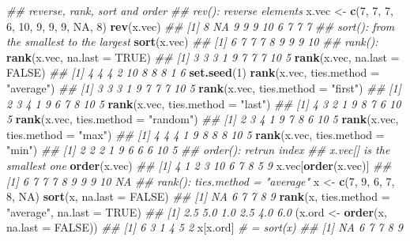 \documentclass[
]{book}
\newenvironment{Shaded}{\begin{snugshade}}{\end{snugshade}}
\newcommand{\CommentTok}[1]{\textcolor[rgb]{0.56,0.35,0.01}{\textit{#1}}}
\newcommand{\DataTypeTok}[1]{\textcolor[rgb]{0.13,0.29,0.53}{#1}}
\newcommand{\DecValTok}[1]{\textcolor[rgb]{0.00,0.00,0.81}{#1}}
\newcommand{\KeywordTok}[1]{\textcolor[rgb]{0.13,0.29,0.53}{\textbf{#1}}}
\newcommand{\NormalTok}[1]{#1}
\newcommand{\OtherTok}[1]{\textcolor[rgb]{0.56,0.35,0.01}{#1}}
\newcommand{\StringTok}[1]{\textcolor[rgb]{0.31,0.60,0.02}{#1}}
\begin{document}
\begin{Shaded}
\begin{Highlighting}[]
\CommentTok{\#\# reverse, rank, sort and order}
\CommentTok{\#\# rev(): reverse elements}
\NormalTok{x.vec \textless{}{-}}\StringTok{ }\KeywordTok{c}\NormalTok{(}\DecValTok{7}\NormalTok{, }\DecValTok{7}\NormalTok{, }\DecValTok{7}\NormalTok{, }\DecValTok{6}\NormalTok{, }\DecValTok{10}\NormalTok{, }\DecValTok{9}\NormalTok{, }\DecValTok{9}\NormalTok{, }\DecValTok{9}\NormalTok{, }\OtherTok{NA}\NormalTok{, }\DecValTok{8}\NormalTok{)}
\KeywordTok{rev}\NormalTok{(x.vec)}
\CommentTok{\#\#  [1]  8 NA  9  9  9 10  6  7  7  7}
\CommentTok{\#\# sort(): from the smallest to the largest}
\KeywordTok{sort}\NormalTok{(x.vec)}
\CommentTok{\#\# [1]  6  7  7  7  8  9  9  9 10}
\CommentTok{\#\# rank():}
\KeywordTok{rank}\NormalTok{(x.vec, }\DataTypeTok{na.last =} \OtherTok{TRUE}\NormalTok{)}
\CommentTok{\#\#  [1]  3  3  3  1  9  7  7  7 10  5}
\KeywordTok{rank}\NormalTok{(x.vec, }\DataTypeTok{na.last =} \OtherTok{FALSE}\NormalTok{)}
\CommentTok{\#\#  [1]  4  4  4  2 10  8  8  8  1  6}
\KeywordTok{set.seed}\NormalTok{(}\DecValTok{1}\NormalTok{)}
\KeywordTok{rank}\NormalTok{(x.vec, }\DataTypeTok{ties.method =} \StringTok{"average"}\NormalTok{)}
\CommentTok{\#\#  [1]  3  3  3  1  9  7  7  7 10  5}
\KeywordTok{rank}\NormalTok{(x.vec, }\DataTypeTok{ties.method =} \StringTok{"first"}\NormalTok{)}
\CommentTok{\#\#  [1]  2  3  4  1  9  6  7  8 10  5}
\KeywordTok{rank}\NormalTok{(x.vec, }\DataTypeTok{ties.method =} \StringTok{"last"}\NormalTok{)}
\CommentTok{\#\#  [1]  4  3  2  1  9  8  7  6 10  5}
\KeywordTok{rank}\NormalTok{(x.vec, }\DataTypeTok{ties.method =} \StringTok{"random"}\NormalTok{)}
\CommentTok{\#\#  [1]  2  3  4  1  9  7  8  6 10  5}
\KeywordTok{rank}\NormalTok{(x.vec, }\DataTypeTok{ties.method =} \StringTok{"max"}\NormalTok{)}
\CommentTok{\#\#  [1]  4  4  4  1  9  8  8  8 10  5}
\KeywordTok{rank}\NormalTok{(x.vec, }\DataTypeTok{ties.method =} \StringTok{"min"}\NormalTok{)}
\CommentTok{\#\#  [1]  2  2  2  1  9  6  6  6 10  5}
\CommentTok{\#\# order(): retrun index}
\CommentTok{\#\# x.vec[] is the smallest one}
\KeywordTok{order}\NormalTok{(x.vec)}
\CommentTok{\#\#  [1]  4  1  2  3 10  6  7  8  5  9}
\NormalTok{x.vec[}\KeywordTok{order}\NormalTok{(x.vec)]}
\CommentTok{\#\#  [1]  6  7  7  7  8  9  9  9 10 NA}
\CommentTok{\#\# rank(): ties.method = "average"}
\NormalTok{x \textless{}{-}}\StringTok{ }\KeywordTok{c}\NormalTok{(}\DecValTok{7}\NormalTok{, }\DecValTok{9}\NormalTok{, }\DecValTok{6}\NormalTok{, }\DecValTok{7}\NormalTok{, }\DecValTok{8}\NormalTok{, }\OtherTok{NA}\NormalTok{)}
\KeywordTok{sort}\NormalTok{(x, }\DataTypeTok{na.last =} \OtherTok{FALSE}\NormalTok{)}
\CommentTok{\#\# [1] NA  6  7  7  8  9}
\KeywordTok{rank}\NormalTok{(x, }\DataTypeTok{ties.method =} \StringTok{"average"}\NormalTok{, }\DataTypeTok{na.last =} \OtherTok{TRUE}\NormalTok{)}
\CommentTok{\#\# [1] 2.5 5.0 1.0 2.5 4.0 6.0}
\NormalTok{(x.ord \textless{}{-}}\StringTok{ }\KeywordTok{order}\NormalTok{(x, }\DataTypeTok{na.last =} \OtherTok{FALSE}\NormalTok{))}
\CommentTok{\#\# [1] 6 3 1 4 5 2}
\NormalTok{x[x.ord] }\CommentTok{\# = sort(x)}
\CommentTok{\#\# [1] NA  6  7  7  8  9}
\end{Highlighting}
\end{Shaded}
\end{document}
